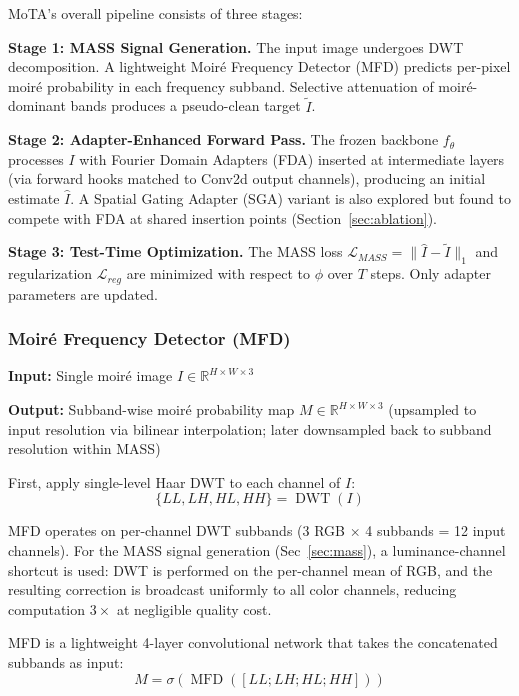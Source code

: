 \documentclass[review,10pt]{elsarticle}
\begin{document}
MoTA's overall pipeline consists of three stages:

\textbf{Stage 1: MASS Signal Generation.} The input image undergoes DWT decomposition. A lightweight Moir\'{e} Frequency Detector (MFD) predicts per-pixel moir\'{e} probability in each frequency subband. Selective attenuation of moir\'{e}-dominant bands produces a pseudo-clean target $\tilde{I}$.

\textbf{Stage 2: Adapter-Enhanced Forward Pass.} The frozen backbone $f_\theta$ processes $I$ with Fourier Domain Adapters (FDA) inserted at intermediate layers (via forward hooks matched to Conv2d output channels), producing an initial estimate $\hat{I}$. A Spatial Gating Adapter (SGA) variant is also explored but found to compete with FDA at shared insertion points (Section~\ref{sec:ablation}).

\textbf{Stage 3: Test-Time Optimization.} The MASS loss $\mathcal{L}_{MASS} = \|\hat{I} - \tilde{I}\|_1$ and regularization $\mathcal{L}_{reg}$ are minimized with respect to $\phi$ over $T$ steps. Only adapter parameters are updated.

\subsubsection{Moir\'{e} Frequency Detector (MFD)}

\textbf{Input:} Single moir\'{e} image $I \in \mathbb{R}^{H \times W \times 3}$

\textbf{Output:} Subband-wise moir\'{e} probability map $M \in \mathbb{R}^{H \times W \times 3}$ (upsampled to input resolution via bilinear interpolation; later downsampled back to subband resolution within MASS)

First, apply single-level Haar DWT to each channel of $I$:
\begin{equation}
\{LL, LH, HL, HH\} = \operatorname{DWT}(I)
\end{equation}

MFD operates on per-channel DWT subbands (3 RGB $\times$ 4 subbands = 12 input channels). For the MASS signal generation (Sec~\ref{sec:mass}), a luminance-channel shortcut is used: DWT is performed on the per-channel mean of RGB, and the resulting correction is broadcast uniformly to all color channels, reducing computation $3\times$ at negligible quality cost.

MFD is a lightweight 4-layer convolutional network that takes the concatenated subbands as input:
\begin{equation}
M = \sigma(\operatorname{MFD}([LL; LH; HL; HH]))
\end{equation}
\end{document}
